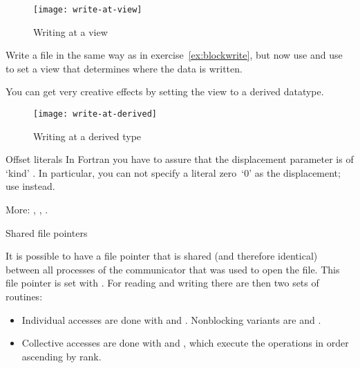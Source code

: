 
\begin{figure}[ht]
  \label{fig:write-view}
  \caption{Writing at a view}
  \texttt{[image: write-at-view]}
\end{figure}

\begin{exercise}
  \label{ex:viewwrite}
  Write a file in the same way as in exercise~\ref{ex:blockwrite},
  but now use  and use  to set
  a view that determines where the data is written.
\end{exercise}

You can get very creative effects by setting the view to a derived
datatype.

\begin{figure}[ht]
  \label{fig:write-derived}
  \caption{Writing at a derived type}
  \texttt{[image: write-at-derived]}
\end{figure}

\begin{fortrannote}{Offset literals}
  In Fortran you have to assure that the displacement parameter is of
  `kind' . In particular, you can not
  specify a literal zero~`0' as the displacement; use
   instead.
\end{fortrannote}

More:
,
,
.

 {Shared file pointers}

It is possible to have a file pointer that is shared (and therefore identical)
between all processes of the communicator that was used to open the file.
This file pointer is set with .
For reading and writing there are then two sets of routines:
\begin{itemize}
\item Individual accesses are done with 
  and .
  Nonblocking variants are 
  and .
\item Collective accesses are done with 
  and , which execute the operations
  in order ascending by rank.
\end{itemize}

